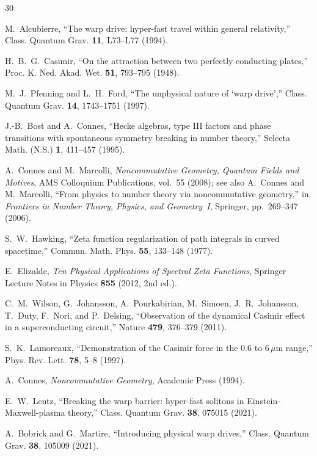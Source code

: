 \documentclass[aps,prd,twocolumn,superscriptaddress,nofootinbib]{revtex4-2}
\begin{document}
\begin{thebibliography}{30}

M.~Alcubierre,
``The warp drive: hyper-fast travel within general relativity,''
Class. Quantum Grav. \textbf{11}, L73--L77 (1994).

H.~B.~G.~Casimir,
``On the attraction between two perfectly conducting plates,''
Proc. K. Ned. Akad. Wet. \textbf{51}, 793--795 (1948).

M.~J.~Pfenning and L.~H.~Ford,
``The unphysical nature of `warp drive',''
Class. Quantum Grav. \textbf{14}, 1743--1751 (1997).

J.-B.~Bost and A.~Connes,
``Hecke algebras, type III factors and phase transitions with
spontaneous symmetry breaking in number theory,''
Selecta Math. (N.S.) \textbf{1}, 411--457 (1995).

A.~Connes and M.~Marcolli,
\emph{Noncommutative Geometry, Quantum Fields and Motives},
AMS Colloquium Publications, vol.~55 (2008);
see also A.~Connes and M.~Marcolli,
``From physics to number theory via noncommutative geometry,''
in \emph{Frontiers in Number Theory, Physics, and Geometry~I},
Springer, pp.~269--347 (2006).

S.~W.~Hawking,
``Zeta function regularization of path integrals in curved spacetime,''
Commun. Math. Phys. \textbf{55}, 133--148 (1977).

E.~Elizalde,
\emph{Ten Physical Applications of Spectral Zeta Functions},
Springer Lecture Notes in Physics \textbf{855} (2012, 2nd ed.).

C.~M.~Wilson, G.~Johansson, A.~Pourkabirian, M.~Simoen,
J.~R.~Johansson, T.~Duty, F.~Nori, and P.~Delsing,
``Observation of the dynamical Casimir effect in a
superconducting circuit,''
Nature \textbf{479}, 376--379 (2011).

S.~K.~Lamoreaux,
``Demonstration of the Casimir force in the 0.6 to $6\,\mu$m range,''
Phys. Rev. Lett. \textbf{78}, 5--8 (1997).

A.~Connes,
\emph{Noncommutative Geometry},
Academic Press (1994).

E.~W.~Lentz,
``Breaking the warp barrier: hyper-fast solitons in
Einstein-Maxwell-plasma theory,''
Class. Quantum Grav. \textbf{38}, 075015 (2021).

A.~Bobrick and G.~Martire,
``Introducing physical warp drives,''
Class. Quantum Grav. \textbf{38}, 105009 (2021).


\end{thebibliography}
\end{document}
